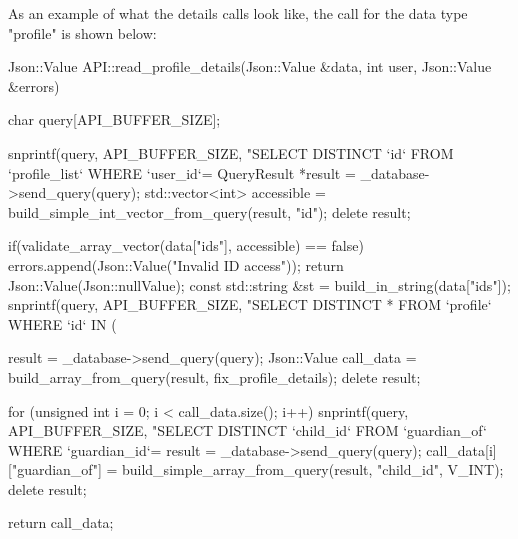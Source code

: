 As an example of what the details calls look like, the call for the data type "profile" is shown below:

\begin{listing}[language=c++, firstline=155]
Json::Value API::read_profile_details(Json::Value &data, int user, Json::Value &errors)
{
	char query[API_BUFFER_SIZE];

	snprintf(query, API_BUFFER_SIZE, "SELECT DISTINCT `id` FROM `profile_list` WHERE `user_id`=%
	QueryResult *result = _database->send_query(query);
	std::vector<int> accessible = build_simple_int_vector_from_query(result, "id");
	delete result;

	if(validate_array_vector(data["ids"], accessible) == false)
	{
			errors.append(Json::Value("Invalid ID access"));
			return Json::Value(Json::nullValue);
	}
	const std::string &st = build_in_string(data["ids"]);
	snprintf(query, API_BUFFER_SIZE, "SELECT DISTINCT * FROM `profile` WHERE `id` IN (%

	result = _database->send_query(query);
	Json::Value call_data = build_array_from_query(result, fix_profile_details);
	delete result;

	for (unsigned int i = 0; i < call_data.size(); i++)
	{
		snprintf(query, API_BUFFER_SIZE, "SELECT DISTINCT `child_id` FROM `guardian_of` WHERE `guardian_id`=%
		result = _database->send_query(query);
		call_data[i]["guardian_of"] = build_simple_array_from_query(result, "child_id", V_INT);
		delete result;
	}

	return call_data;
}
\end{listing}

